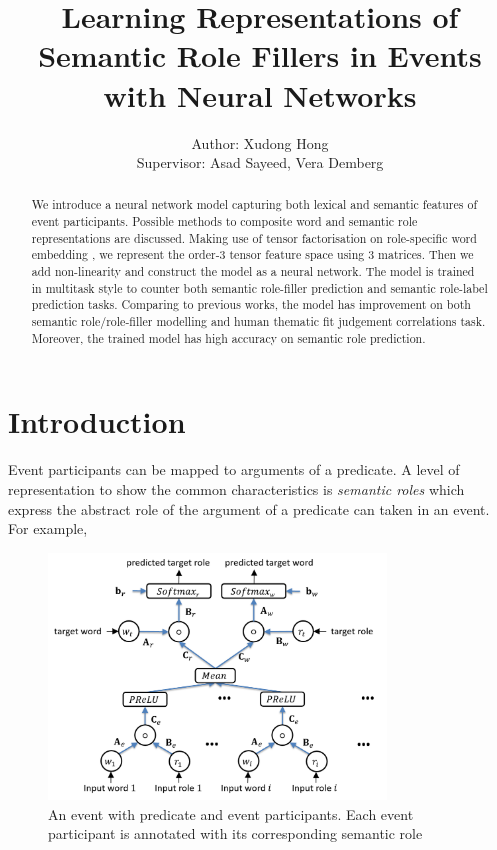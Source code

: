 \documentclass[a4paper]{article}
\title{Learning Representations of Semantic Role Fillers in Events with Neural Networks}
\author{Author: Xudong Hong \\ 
Supervisor: Asad Sayeed, Vera Demberg}
\begin{document}
\maketitle

\begin{abstract}
We introduce a neural network model capturing both lexical and semantic features of event participants. Possible methods to composite word and semantic role representations are discussed. Making use of tensor factorisation on role-specific word embedding \citep{tilk-EtAl:2016:EMNLP2016}, we represent the order-3 tensor feature space using 3 matrices. Then we add non-linearity and construct the model as a neural network. The model is trained in multitask style to counter both semantic role-filler prediction and semantic role-label prediction tasks. Comparing to previous works, the model has improvement on both semantic role/role-filler modelling and human thematic fit judgement correlations task. Moreover, the trained model has high accuracy on semantic role prediction. 
\end{abstract}



\section{Introduction}
Event participants can be mapped to arguments of a predicate.
A level of representation to show the common characteristics is \textit{semantic roles} which express the abstract role of the argument of a predicate can taken in an event. 
For example, 
\begin{figure}[ht]
\centering
\includegraphics[width=0.8\textwidth]{BOP.png}
\caption{\label{fig:SemanticRoles} An event with predicate and event participants. Each event participant is annotated with its corresponding semantic role}
\end{figure}
\end{document}
